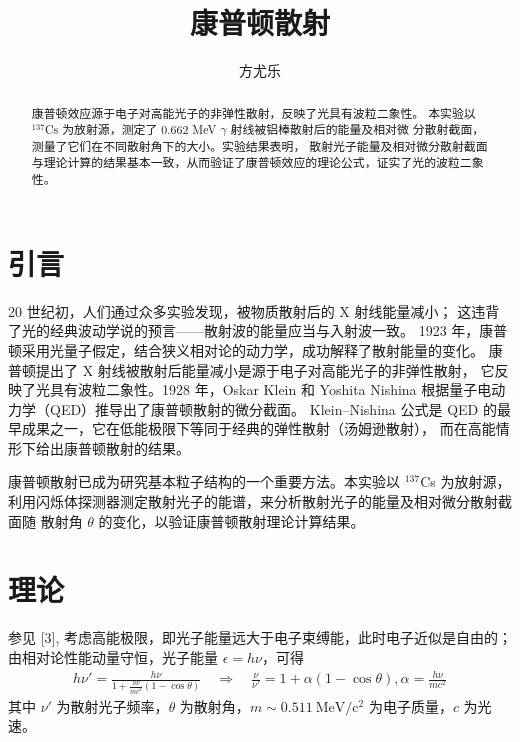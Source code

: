 \documentclass[revtex4-2]{mpltx}
\begin{document}
\title{康普顿散射}
\author{方尤乐}

\begin{abstract}
    康普顿效应源于电子对高能光子的非弹性散射，反映了光具有波粒二象性。
    本实验以 ${}^{137}$Cs 为放射源，测定了 0.662 MeV $\gamma$ 射线被铝棒散射后的能量及相对微
    分散射截面，测量了它们在不同散射角下的大小。实验结果表明，
    散射光子能量及相对微分散射截面与理论计算的结果基本一致，从而验证了康普顿效应的理论公式，证实了光的波粒二象性。
\end{abstract}
\maketitle
\section{引言}
20 世纪初，人们通过众多实验发现，被物质散射后的 X 射线能量减小；
这违背了光的经典波动学说的预言——散射波的能量应当与入射波一致。
1923 年，康普顿采用光量子假定，结合狭义相对论的动力学，成功解释了散射能量的变化。
康普顿提出了 X 射线被散射后能量减小是源于电子对高能光子的非弹性散射，
它反映了光具有波粒二象性。1928 年，Oskar Klein 和 Yoshita Nishina 根据量子电动力学（QED）推导出了康普顿散射的微分截面。
Klein–Nishina 公式是 QED 的最早成果之一，它在低能极限下等同于经典的弹性散射（汤姆逊散射），
而在高能情形下给出康普顿散射的结果。

康普顿散射已成为研究基本粒子结构的一个重要方法。本实验以 ${}^{137}$Cs 为放射源，
利用闪烁体探测器测定散射光子的能谱，来分析散射光子的能量及相对微分散射截面随
散射角 $\theta$ 的变化，以验证康普顿散射理论计算结果。
\section{理论}\label{sec:theory}
参见 [3], 考虑高能极限，即光子能量远大于电子束缚能，此时电子近似是自由的；
由相对论性能动量守恒，光子能量 $\epsilon = h\nu$，可得
\begin{align}
    \label{eq:3}h\nu'=\frac{h\nu}{1+\frac{h\nu}{mc^2}(1-\cos\theta)}
    \quad \Rightarrow \quad \frac{\nu}{\nu'}=1+\alpha(1-\cos\theta),\alpha=\frac{h\nu}{mc^2}
\end{align}
其中 $\nu'$ 为散射光子频率，$\theta$ 为散射角，$m\sim 0.511\ \mathrm{MeV/c^2}$ 为电子质量，$c$ 为光速。
\end{document}

